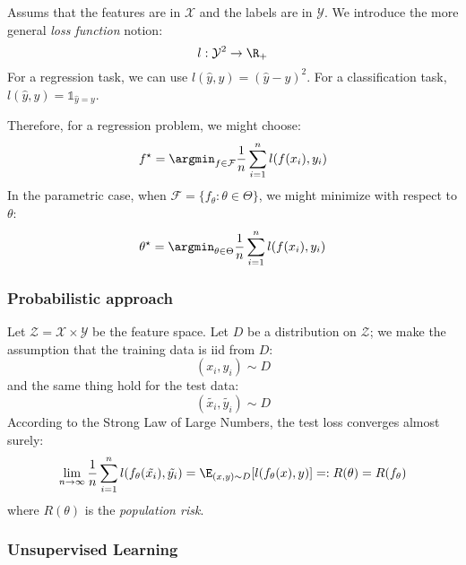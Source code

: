 \documentclass[toc]{../cs-classes/cs-classes}
\begin{document}
\begin{definition}
    Assums that the features are in $\mathcal{X}$ and the labels are in $\mathcal{Y}$. We introduce the more general \emph{loss function} notion:
    \begin{equation*}
        l:\mathcal{Y}^2\to \R_+
    \end{equation*}
    For a regression task, we can use $l(\hat{y}, y)=(\hat{y}-y)^2$. For a classification task, $l(\hat{y}, y)=\mathds{1}_{\hat{y}=y}$.
\end{definition}

Therefore, for a regression problem, we might choose:
\begin{equation*}
    f^\star=\argmin_{f\in\mathcal{F}}\frac{1}{n}\sum_{i=1}^n l(f(x_i), y_i)
\end{equation*}
In the parametric case, when $\mathcal{F}=\{f_\theta : \theta\in\Theta\}$, we might minimize with respect to $\theta$:
\begin{equation*}
    \theta^\star=\argmin_{\theta\in\Theta}\frac{1}{n}\sum_{i=1}^n l(f(x_i), y_i)
\end{equation*}

\subsubsection{Probabilistic approach}
Let $\mathcal{Z}=\mathcal{X}\times\mathcal{Y}$ be the feature space. Let $D$ be a distribution on $\mathcal{Z}$; we make the assumption that the training data is iid from $D$:
\begin{equation*}
    (x_i, y_i)\sim D
\end{equation*}
and the same thing hold for the test data:
\begin{equation*}
    (\tilde{x_i}, \tilde{y_i})\sim D
\end{equation*}
According to the Strong Law of Large Numbers, the test loss converges almost surely:
\begin{equation*}
    \lim_{n\to\infty}\frac{1}{n}\sum_{i=1}^n l(f_\theta(\tilde{x_i}), \tilde{y_i}) = \E_{(x, y)\sim D}[l(f_\theta(x), y)] =: R(\theta)=R(f_\theta)
\end{equation*}
where $R(\theta)$ is the \emph{population risk}.

\begin{definition}
    
\end{definition}

\subsubsection{Unsupervised Learning}
\begin{example}[Clustering]
    
\end{example}
\end{document}
